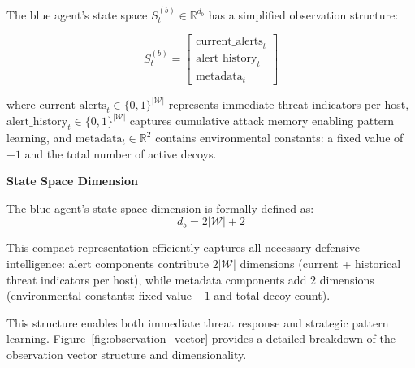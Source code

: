 \documentclass[12pt,oneside]{article}
\begin{document}
The blue agent's state space $S^{(b)}_t \in \mathbb{R}^{d_b}$ has a simplified observation structure:

\begin{equation}
S^{(b)}_t = \begin{bmatrix}
\text{current\_alerts}_t \\
\text{alert\_history}_t \\
\text{metadata}_t
\end{bmatrix}
\end{equation}

where $\text{current\_alerts}_t \in \{0,1\}^{|\mathcal{W}|}$ represents immediate threat indicators per host, $\text{alert\_history}_t \in \{0,1\}^{|\mathcal{W}|}$ captures cumulative attack memory enabling pattern learning, and $\text{metadata}_t \in \mathbb{R}^2$ contains environmental constants: a fixed value of $-1$ and the total number of active decoys.

\textbf{State Space Dimension}

The blue agent's state space dimension is formally defined as:
\begin{equation}
d_b = 2|\mathcal{W}| + 2
\label{eq:state_dimension}
\end{equation}

This compact representation efficiently captures all necessary defensive intelligence: alert components contribute $2|\mathcal{W}|$ dimensions (current + historical threat indicators per host), while metadata components add $2$ dimensions (environmental constants: fixed value $-1$ and total decoy count).

This structure enables both immediate threat response and strategic pattern learning. Figure~\ref{fig:observation_vector} provides a detailed breakdown of the observation vector structure and dimensionality.
\end{document}

